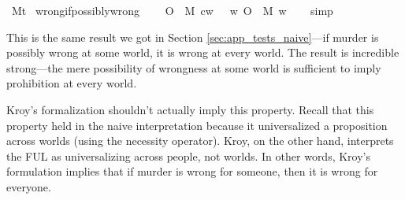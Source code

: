\begin{isabellebody}
\ M{\isacharcolon}{\isacharcolon}{\isachardoublequoteopen}t{\isachardoublequoteclose}\isanewline
%
\isanewline
\isanewline
{}\isamarkupfalse%
\ wrong{\isacharunderscore}if{\isacharunderscore}possibly{\isacharunderscore}wrong{\isacharcolon}\isanewline
\ \ \ {\isachardoublequoteopen}{\isacharparenleft}{\isacharparenleft}{\isasymdiamond}\ {\isacharparenleft}O\ {\isacharbraceleft}\isactrlbold {\isasymnot}\ M{\isacharbraceright}{\isacharparenright}{\isacharparenright}\ cw{\isacharparenright}\ {\isasymlongrightarrow}\ \ {\isacharparenleft}{\isasymforall}w{\isachardot}\ {\isacharparenleft}O\ {\isacharbraceleft}\isactrlbold {\isasymnot}\ M{\isacharbraceright}{\isacharparenright}\ w{\isacharparenright}{\isachardoublequoteclose}\isanewline
%
\isadelimproof
\ \ %
\endisadelimproof
%
\isatagproof
{}\isamarkupfalse%
\ simp\isanewline
%
%
\endisatagproof
{\isafoldproof}%
%
\isadelimproof
%
\endisadelimproof
%
\begin{isamarkuptext}%
This is the same result we got in Section \ref{sec:app_tests_naive}—if murder is possibly wrong at some world, it is wrong at
every world. The result is incredible strong—the mere possibility of wrongness at some world is sufficient
to imply prohibition at $\text{every world}$. 

Kroy's formalization shouldn't actually imply this property. Recall that this property held in the 
naive interpretation because it universalized a proposition across worlds (using the necessity operator).
Kroy, on the other hand, interprets the FUL as universalizing across $\text{people}$, not worlds. 
In other words, Kroy's formulation implies that if murder is wrong for someone, then it is wrong for 
everyone. 


\end{isamarkuptext}
\end{isabellebody}
